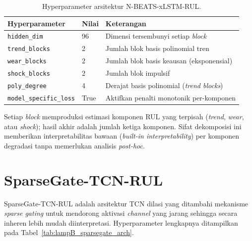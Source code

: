 \begin{table}[ht]
  \centering
  \caption{Hyperparameter arsitektur N-BEATS-xLSTM-RUL.}
  \label{tab:lampB_nbeats_xlstm_arch}
  \small
  \begin{tabular}{@{}lll@{}}
    \toprule
    \textbf{Hyperparameter} & \textbf{Nilai} & \textbf{Keterangan} \\
    \midrule
    \texttt{hidden\_dim} & 96 & Dimensi tersembunyi setiap \emph{block} \\
    \texttt{trend\_blocks} & 2 & Jumlah blok basis polinomial tren \\
    \texttt{wear\_blocks} & 2 & Jumlah blok basis keausan (eksponensial) \\
    \texttt{shock\_blocks} & 2 & Jumlah blok impulsif \\
    \texttt{poly\_degree} & 4 & Derajat basis polinomial (\emph{trend blocks}) \\
    \texttt{model\_specific\_loss} & True & Aktifkan penalti monotonik per-komponen \\
    \bottomrule
  \end{tabular}
\end{table}

Setiap \emph{block} memproduksi estimasi komponen RUL yang terpisah
(\emph{trend}, \emph{wear}, atau \emph{shock}); hasil akhir adalah jumlah
ketiga komponen. Sifat dekomposisi ini memberikan interpretabilitas bawaan
(\emph{built-in interpretability}) per komponen degradasi tanpa memerlukan
analisis \emph{post-hoc}.

\section{SparseGate-TCN-RUL}
\label{lamp:hparam_sparsegate}

SparseGate-TCN-RUL adalah arsitektur TCN dilasi yang ditambahi mekanisme
\emph{sparse gating} untuk mendorong aktivasi \emph{channel} yang jarang
sehingga secara inheren lebih mudah diinterpretasi. Hyperparameter lengkapnya
ditampilkan pada Tabel~\ref{tab:lampB_sparsegate_arch}.

